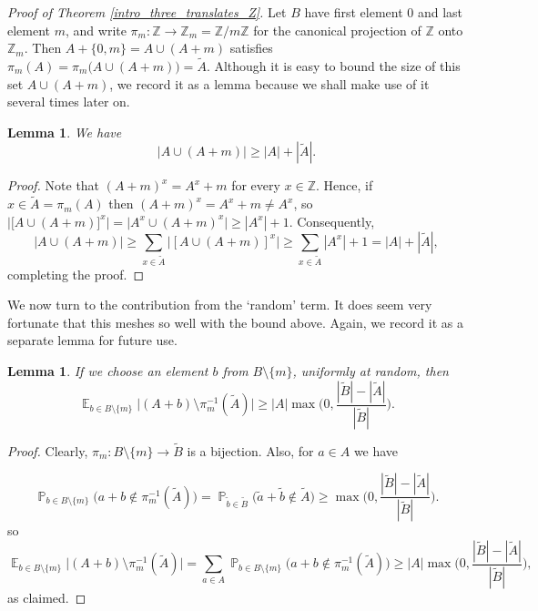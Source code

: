 \documentclass[12pt,reqno]{amsart}
\DeclareMathOperator*{\E}{\mathbb{E}}
\DeclareMathOperator*{\Prob}{\mathbb{P}}
\newtheorem{lemma}[theorem]{Lemma}
\theoremstyle{definition}
\renewcommand\geq{\geqslant}
\begin{document}
\vspace{5pt}
\noindent
{\em Proof of Theorem \ref{intro_three_translates_Z}.}
Let $B$ have first element $0$ and last element $m$, and write $\pi_m: {\mathbb Z} \to {\mathbb Z}_m={\mathbb Z}/m {\mathbb Z}$ for the canonical projection of ${\mathbb Z}$ onto ${\mathbb Z}_m$. Then $A+\{0, m\}=A\cup (A+m)$ satisfies
$\pi_m(A)=\pi_m\big(A\cup (A+m)\big)= \widetilde{A}$. Although it is easy to bound the size of this set $A\cup (A+m)$, we record it as a lemma because we shall make use of it several times later on.

\begin{lemma}\label{lem8.1}
We have
\[
\bigg|A\cup (A+m) \bigg| \geq |A|+|\widetilde{A}|.
\]
\end{lemma}
\begin{proof}
Note that $(A+m)^x=A^x+m$ for every $x\in {\mathbb Z}$. Hence, if $x\in \widetilde{A}=\pi_m(A)$ then
$(A+m)^x=A^x+m\ne A^x$,
so
$
\bigg| \big[A\cup (A+m)\big]^x\bigg|=\bigg|A^x\cup (A+m)^x \bigg| \geq |A^x|+1.
$
Consequently,
\[
\bigg|A\cup (A+m)\bigg| \geq \sum_{x\in \widetilde{A}} \bigg|[A\cup (A+m)]^x\bigg| \geq \sum_{x\in \widetilde{A}} |A^x|+1 = |A|+|\widetilde{A}|,
\]
completing the proof.
\end{proof}

\vspace{5pt}
We now turn to the contribution from the `random' term. It does seem very fortunate that this meshes so well with the bound above. Again, we record it as a separate lemma for future use.


\begin{lemma}\label{lem8.2specialcase} If we choose an element $b$ from $B \setminus \{m\}$, uniformly at random, then
$$\E_{b\in B\setminus \{m\}}\bigg|(A+b) \setminus \pi_m^{-1}(\widetilde{A})\bigg| \geq
|A| \max\bigg(0,\frac{|\widetilde{B}|-|\widetilde{A}|}{|\widetilde{B}|}\bigg).$$
\end{lemma}
\begin{proof}
Clearly, $\pi_m: B\setminus\{m\} \to \widetilde{B}$ is a bijection. Also, for $a\in A$  we have

\begin{equation*}
        \Prob_{b \in B\setminus \{m\}} \bigg(a+b\not \in \pi^{-1}_m(\widetilde{A})\bigg) =\Prob_{\widetilde{b}\in \widetilde{B}}\bigg(\widetilde{a}+\widetilde{b}\not \in \widetilde{A}\bigg)
        \geq \max\bigg(0,\frac{|\widetilde{B}| - |\widetilde{A}|}{|\widetilde{B}|}\bigg).
\end{equation*}
so
\begin{equation*}
        \E_{b \in B\setminus \{m\}} \bigg|(A+b)\setminus \pi^{-1}_m(\widetilde{A})\bigg| = \sum_{a\in A}\Prob_{b\in B\setminus\{m\}}\bigg(a+b\not \in \pi_m^{-1}(\widetilde{A})\bigg)
        \geq |A|\max\bigg(0,\frac{|\widetilde{B}| - |\widetilde{A}|}{|\widetilde{B}|}\bigg),
\end{equation*}
as claimed.
\end{proof}
\end{document}
